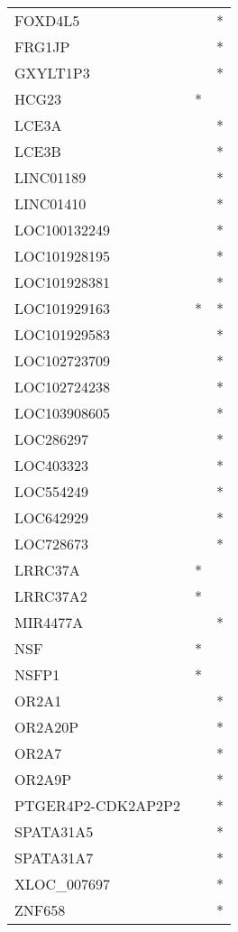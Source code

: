 \begin{longtable}{lcc}
FOXD4L5            &                &          * \\
FRG1JP             &                &          * \\
GXYLT1P3           &                &          * \\
HCG23              &              * &            \\
LCE3A              &                &          * \\
LCE3B              &                &          * \\
LINC01189          &                &          * \\
LINC01410          &                &          * \\
LOC100132249       &                &          * \\
LOC101928195       &                &          * \\
LOC101928381       &                &          * \\
LOC101929163       &              * &          * \\
LOC101929583       &                &          * \\
LOC102723709       &                &          * \\
LOC102724238       &                &          * \\
LOC103908605       &                &          * \\
LOC286297          &                &          * \\
LOC403323          &                &          * \\
LOC554249          &                &          * \\
LOC642929          &                &          * \\
LOC728673          &                &          * \\
LRRC37A            &              * &            \\
LRRC37A2           &              * &            \\
MIR4477A           &                &          * \\
NSF                &              * &            \\
NSFP1              &              * &            \\
OR2A1              &                &          * \\
OR2A20P            &                &          * \\
OR2A7              &                &          * \\
OR2A9P             &                &          * \\
PTGER4P2-CDK2AP2P2 &                &          * \\
SPATA31A5          &                &          * \\
SPATA31A7          &                &          * \\
XLOC\_007697        &                &          * \\
ZNF658             &                &          * \\
\end{longtable}
